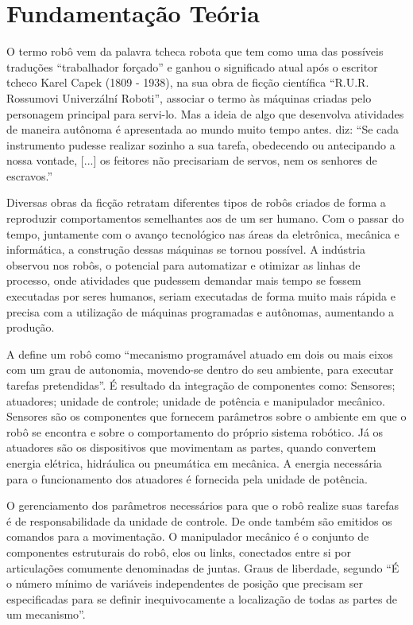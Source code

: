 \chapter{Fundamentação Teória}
\label{chap:concep}
O termo robô vem da palavra tcheca robota que tem como uma das possíveis traduções “trabalhador forçado” e ganhou o significado atual após o escritor tcheco Karel Capek (1809 - 1938), na sua obra de ficção científica “R.U.R. Rossumovi Univerzální Roboti”, associar o termo às máquinas criadas pelo personagem principal para servi-lo. Mas a ideia de algo que desenvolva atividades de maneira autônoma é apresentada ao mundo muito tempo antes. \cite{aristoteles1985traduccao} diz: “Se cada instrumento pudesse realizar sozinho a sua tarefa, obedecendo ou antecipando a nossa vontade, [...] os feitores não precisariam de servos, nem os senhores de escravos.” 

Diversas obras da ficção retratam diferentes tipos de robôs criados de forma a reproduzir comportamentos semelhantes aos de um ser humano. Com o passar do tempo, juntamente com o avanço tecnológico nas áreas da eletrônica, mecânica e informática, a construção dessas máquinas se tornou possível. A indústria observou nos robôs, o potencial para automatizar e otimizar as linhas de processo, onde atividades que pudessem demandar mais tempo se fossem executadas por seres humanos, seriam executadas de forma muito mais rápida e precisa com a utilização de máquinas programadas e autônomas, aumentando a produção.

A \cite{iso2012} define um robô como “mecanismo programável atuado em dois ou mais eixos com um grau de autonomia, movendo-se dentro do seu ambiente, para executar tarefas pretendidas”. É resultado da integração de componentes como: Sensores; atuadores; unidade de controle; unidade de potência e manipulador mecânico. Sensores são os componentes que fornecem parâmetros sobre o ambiente em que o robô se encontra e sobre o comportamento do próprio sistema robótico. Já os atuadores são os dispositivos que movimentam as partes, quando convertem energia elétrica, hidráulica ou pneumática em mecânica. A energia necessária para o funcionamento dos atuadores é fornecida pela unidade de potência.

O gerenciamento dos parâmetros necessários para que o robô realize suas tarefas é de responsabilidade da unidade de controle. De onde também são emitidos os comandos para a movimentação. O manipulador mecânico é o conjunto de componentes estruturais do robô, elos ou links, conectados entre si por articulações comumente denominadas de juntas. Graus de liberdade, segundo \cite{romanorobotica} “É o número mínimo de variáveis independentes de posição que precisam ser especificadas para se definir inequivocamente a localização de todas as partes de um mecanismo”.

